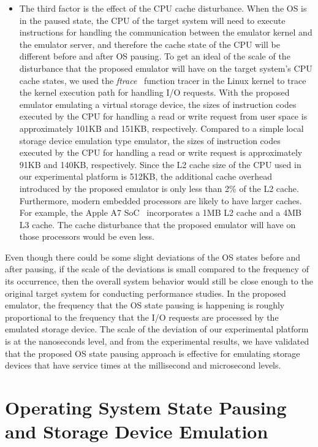 \begin{itemize}
	\item The third factor is the effect of the CPU cache disturbance. When the OS is in the paused state, the CPU of the target system will need to execute instructions for handling the communication between the emulator kernel and the emulator server, and therefore the cache state of the CPU will be different before and after OS pausing. To get an ideal of the scale of the disturbance that the proposed emulator will have on the target system's CPU cache states, we used the \textit{ftrace}~\cite{Kernel:2014} function tracer in the Linux kernel to trace the kernel execution path for handling I/O requests. With the proposed emulator emulating a virtual storage device, the sizes of instruction codes executed by the CPU for handling a read or write request from user space is approximately 101KB and 151KB, respectively. Compared to a simple local storage device emulation type emulator, the sizes of instruction codes executed by the CPU for handling a read or write request is approximately 91KB and 140KB, respectively. Since the L2 cache size of the CPU used in our experimental platform is 512KB, the additional cache overhead introduced by the proposed emulator is only less than 2\% of the L2 cache. Furthermore, modern embedded processors are likely to have larger caches. For example, the Apple A7 SoC~\cite{wiki:2015:A7} incorporates a 1MB L2 cache and a 4MB L3 cache. The cache disturbance that the proposed emulator will have on those processors would be even less.
\end{itemize}

Even though there could be some slight deviations of the OS states before and after pausing, if the scale of the deviations is small compared to the frequency of its occurrence, then the overall system behavior would still be close enough to the original target system for conducting performance studies. In the proposed emulator, the frequency that the OS state pausing is happening is roughly proportional to the frequency that the I/O requests are processed by the emulated storage device. The scale of the deviation of our experimental platform is at the nanoseconds level, and from the experimental results, we have validated that the proposed OS state pausing approach is effective for emulating storage devices that have service times at the millisecond and microsecond levels.

\section{Operating System State Pausing and Storage Device Emulation}
\label{sec:ch6-6.2}

